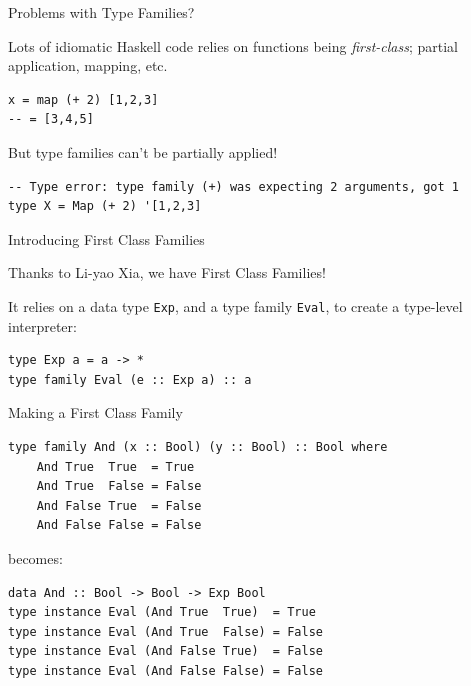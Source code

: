 \documentclass{beamer}
\newcommand{\inline}[1]{\lstinline[basicstyle=\ttfamily]{#1}}
\begin{document}
\begin{frame}[fragile]{Problems with Type Families?}

Lots of idiomatic Haskell code relies on functions being \emph{first-class}; partial application, mapping, etc.

\begin{lstlisting}
x = map (+ 2) [1,2,3]
-- = [3,4,5]
\end{lstlisting}

\pause

But type families can't be partially applied!

\begin{lstlisting}
-- Type error: type family (+) was expecting 2 arguments, got 1
type X = Map (+ 2) '[1,2,3]
\end{lstlisting}
    
\end{frame}

\begin{frame}[fragile]{Introducing First Class Families}

Thanks to Li-yao Xia, we have First Class Families!

It relies on a data type \inline{Exp}, and a type family \inline{Eval}, to create a type-level interpreter:

\begin{lstlisting}
type Exp a = a -> *
type family Eval (e :: Exp a) :: a
\end{lstlisting}


\end{frame}

\begin{frame}[fragile]{Making a First Class Family}

\begin{lstlisting}
type family And (x :: Bool) (y :: Bool) :: Bool where
    And True  True  = True
    And True  False = False
    And False True  = False
    And False False = False
\end{lstlisting}

becomes:

\begin{lstlisting}
data And :: Bool -> Bool -> Exp Bool
type instance Eval (And True  True)  = True
type instance Eval (And True  False) = False
type instance Eval (And False True)  = False
type instance Eval (And False False) = False
\end{lstlisting}

\end{frame}
\end{document}

